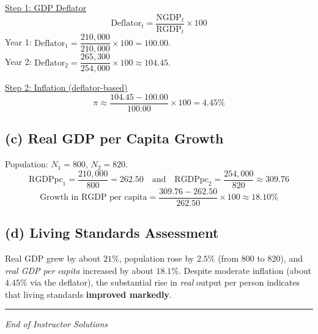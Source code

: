 \documentclass[12pt]{article}
\begin{document}
\underline{Step 1: GDP Deflator} \\
\[
\text{Deflator}_t = \frac{\text{NGDP}_t}{\text{RGDP}_t}\times 100
\]
Year 1: $\text{Deflator}_1 = \dfrac{210{,}000}{210{,}000}\times 100 = \boxed{100.00}$. \\
Year 2: $\text{Deflator}_2 = \dfrac{265{,}300}{254{,}000}\times 100 \approx \boxed{104.45}.
$

\underline{Step 2: Inflation (deflator-based)} \\
\[
\pi \approx \frac{104.45 - 100.00}{100.00}\times 100 = \boxed{4.45\%}
\]

\subsection*{(c) Real GDP per Capita Growth}

Population: $N_1=800$, $N_2=820$. \\
\[
\text{RGDPpc}_1 = \frac{210{,}000}{800} = \boxed{262.50}
\quad\text{and}\quad
\text{RGDPpc}_2 = \frac{254{,}000}{820} \approx \boxed{309.76}
\]
\[
\text{Growth in RGDP per capita} = \frac{309.76 - 262.50}{262.50}\times 100 \approx \boxed{18.10\%}
\]

\subsection*{(d) Living Standards Assessment}

Real GDP grew by about $21\%$, population rose by $2.5\%$ (from 800 to 820), and \emph{real GDP per capita} increased by about $18.1\%$. Despite moderate inflation (about $4.45\%$ via the deflator), the substantial rise in \emph{real} output per person indicates that living standards \textbf{improved markedly}.

\vspace{0.5em}
\hrule
\vspace{0.5em}

\begin{center}
\textit{End of Instructor Solutions}
\end{center}
\end{document}
